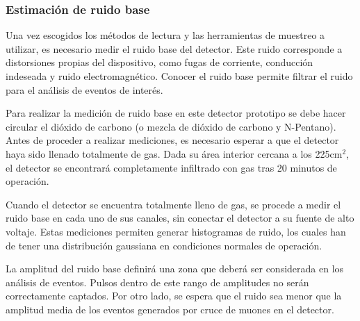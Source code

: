 		

	\subsubsection{Estimación de ruido base}
		Una vez escogidos los métodos de lectura y las herramientas de muestreo a utilizar, es necesario medir el ruido base del detector. Este ruido corresponde a distorsiones propias del dispositivo, como fugas de corriente, conducción indeseada y ruido electromagnético. Conocer el ruido base  permite filtrar el ruido para el análisis de eventos de interés.
		
		Para realizar la medición de ruido base en este detector prototipo se debe hacer circular el dióxido de carbono (o mezcla de dióxido de carbono y N-Pentano). Antes de proceder a realizar mediciones, es necesario esperar a que el detector haya sido llenado totalmente de gas. Dada su área interior cercana a los 225cm$^2$, el detector se encontrará completamente infiltrado con gas tras 20 minutos de operación. 
		
		Cuando el detector se encuentra totalmente lleno de gas, se procede a medir el ruido base en cada uno de sus canales, sin conectar el detector a su fuente de alto voltaje. Estas mediciones permiten generar histogramas de ruido, los cuales han de tener una distribución gaussiana en condiciones normales de operación. 
		
		La amplitud del ruido base definirá una zona que deberá ser considerada en los análisis de eventos. Pulsos dentro de este rango de amplitudes no serán correctamente captados. Por otro lado, se espera que el ruido sea menor que la amplitud media de los eventos generados por cruce de muones en el detector.
		
